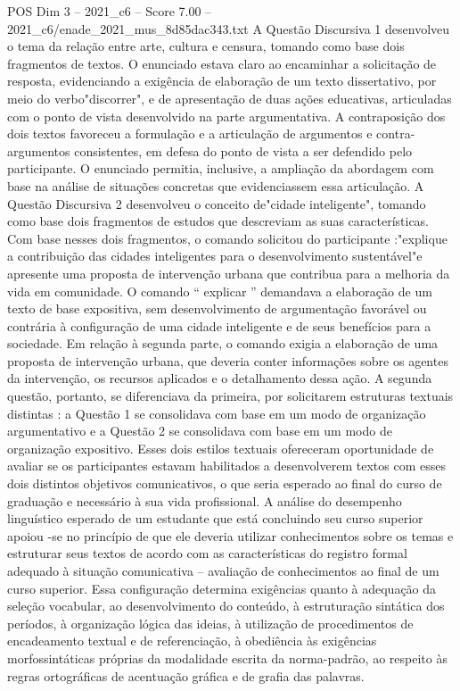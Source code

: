 \begin{textsample}{POS Dim 3 – 2021\_c6 – Score 7.00 – 2021\_c6/enade\_2021\_mus\_8d85dac343.txt}
A Questão Discursiva 1 desenvolveu o tema da relação entre arte, cultura e censura, tomando como base dois fragmentos de textos.
O enunciado estava claro ao encaminhar a solicitação de resposta, evidenciando a exigência de elaboração de um texto dissertativo, por meio do verbo"discorrer", e de apresentação de duas ações educativas, articuladas com o ponto de vista desenvolvido na parte argumentativa.
A contraposição dos dois textos favoreceu a formulação e a articulação de argumentos e contra-argumentos consistentes, em defesa do ponto de vista a ser defendido pelo participante.
O enunciado permitia, inclusive, a ampliação da abordagem com base na análise de situações concretas que evidenciassem essa articulação.
A Questão Discursiva 2 desenvolveu o conceito de"cidade inteligente", tomando como base dois fragmentos de estudos que descreviam as suas características.
Com base nesses dois fragmentos, o comando solicitou do participante :"explique a contribuição das cidades inteligentes para o desenvolvimento sustentável"e apresente uma proposta de intervenção urbana que contribua para a melhoria da vida em comunidade.
O comando “ explicar ” demandava a elaboração de um texto de base expositiva, sem desenvolvimento de argumentação favorável ou contrária à configuração de uma cidade inteligente e de seus benefícios para a sociedade.
Em relação à segunda parte, o comando exigia a elaboração de uma proposta de intervenção urbana, que deveria conter informações sobre os agentes da intervenção, os recursos aplicados e o detalhamento dessa ação.
A segunda questão, portanto, se diferenciava da primeira, por solicitarem estruturas textuais distintas : a Questão 1 se consolidava com base em um modo de organização argumentativo e a Questão 2 se consolidava com base em um modo de organização expositivo.
Esses dois estilos textuais ofereceram oportunidade de avaliar se os participantes estavam habilitados a desenvolverem textos com esses dois distintos objetivos comunicativos, o que seria esperado ao final do curso de graduação e necessário à sua vida profissional.
A análise do desempenho linguístico esperado de um estudante que está concluindo seu curso superior apoiou -se no princípio de que ele deveria utilizar conhecimentos sobre os temas e estruturar seus textos de acordo com as características do registro formal adequado à situação comunicativa – avaliação de conhecimentos ao final de um curso superior.
Essa configuração determina exigências quanto à adequação da seleção vocabular, ao desenvolvimento do conteúdo, à estruturação sintática dos períodos, à organização lógica das ideias, à utilização de procedimentos de encadeamento textual e de referenciação, à obediência às exigências morfossintáticas próprias da modalidade escrita da norma-padrão, ao respeito às regras ortográficas de acentuação gráfica e de grafia das palavras.

\end{textsample}
